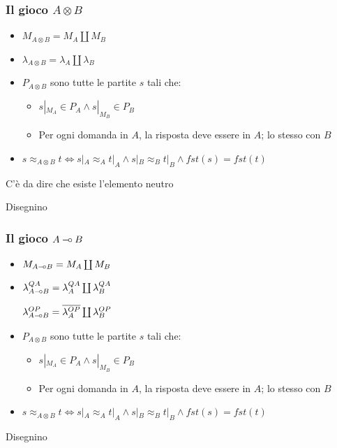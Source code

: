\documentclass{beamer}
\newcommand{\limp}{\mathbin{{-}\mkern-3.5mu{\circ}}}
\begin{document}
\begin{frame}
	
	\frametitle{Il gioco $A \otimes B$}
	
	\begin{itemize}
		\item $M_{A\otimes B}=M_A \coprod M_B$
		\item $\lambda_{A\otimes B}=\lambda_A \coprod \lambda_B$
		\item $P_{A\otimes B}$ sono tutte le partite $s$ tali che:
		\begin{itemize}
			\item $s|_{M_A} \in P_A \wedge s|_{M_B} \in P_B$
			\item Per ogni domanda in $A$, la risposta deve essere in $A$; lo stesso con $B$
		\end{itemize}
		\item $s\approx_{A\otimes B} t \Leftrightarrow s|_A \approx_A t|_A \wedge s|_B \approx_B t|_B \wedge fst(s)=fst(t)$ 
	\end{itemize}
	
	C'è da dire che esiste l'elemento neutro	
	
	Disegnino
	
\end{frame}


\begin{frame}
	
	\frametitle{Il gioco $A \limp B$}
	
	\begin{itemize}
		\item $M_{A\limp B}=M_A \coprod M_B$
		\item $\lambda^{QA}_{A\limp B}=\lambda^{QA}_A \coprod \lambda^{QA}_B$
		
		$\lambda^{OP}_{A\limp B}=\overline{\lambda^{OP}_A} \coprod \lambda^{OP}_B$
		\item $P_{A\otimes B}$ sono tutte le partite $s$ tali che:
		\begin{itemize}
			\item $s|_{M_A} \in P_A \wedge s|_{M_B} \in P_B$
			\item Per ogni domanda in $A$, la risposta deve essere in $A$; lo stesso con $B$
		\end{itemize}
		\item $s\approx_{A\otimes B} t \Leftrightarrow s|_A \approx_A t|_A \wedge s|_B \approx_B t|_B \wedge fst(s)=fst(t)$ 
	\end{itemize}
	
	Disegnino
	
\end{frame}
\end{document}
